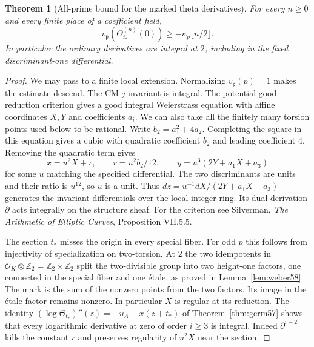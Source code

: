\documentclass[a4paper,11pt]{article}
\newtheorem{theorem}[proposition]{Theorem}
\theoremstyle{definition}
\theoremstyle{remark}
\newcommand{\ZZ}{\mathbb Z}\newcommand{\ord}{\operatorname{ord}}
\numberwithin{equation}{section}
\newcommand{\OO}{\mathcal O}
\begin{document}
\begin{theorem}[All-prime bound for the marked theta derivatives]\leavevmode
\label{thm:elliptic312}
For every \(n\ge0\) and every finite place of a coefficient field,
\[
 v_{\mathfrak p}\!\left(\Theta_{t_*}^{(n)}(0)\right)
                 \ge -\kappa_p\lfloor n/2\rfloor .
\]
In particular the ordinary derivatives are integral at \(2\),
including in the fixed discriminant-one differential.
\end{theorem}
\begin{proof}
We may pass to a finite local extension. Normalizing \(v_{\mathfrak p}(p)=1\)
makes the estimate descend. The CM \(j\)-invariant is integral.
The potential good reduction criterion gives a good integral
Weierstrass equation with affine coordinates \(X,Y\) and coefficients
\(a_i\). We can also take all the finitely many torsion points used
below to be rational. Write \(b_2=a_1^2+4a_2\). Completing the square
in this equation gives a cubic with quadratic coefficient \(b_2\)
and leading coefficient \(4\). Removing the quadratic term gives
\[
 x=u^2X+r,\qquad r=u^2 b_2/12,\qquad
 y=u^3(2Y+a_1X+a_3)
\]
for some \(u\) matching the specified differential. The two
discriminants are units and their ratio is \(u^{12}\), so \(u\)
is a unit. Thus \(dz=u^{-1}dX/(2Y+a_1X+a_3)\) generates the
invariant differentials over the local integer ring. Its dual
derivation \(\partial\) acts integrally on the structure sheaf.
For the criterion see Silverman, \emph{The Arithmetic of Elliptic
Curves}, Proposition VII.5.5.

The section \(t_*\) misses the origin in every special fiber.
For odd \(p\) this follows from injectivity of specialization
on two-torsion. At \(2\) the two idempotents in
\(\OO_K\otimes\ZZ_2=\ZZ_2\times\ZZ_2\) split the
two-divisible group into two height-one factors, one connected
in the special fiber and one \'{e}tale, as proved in
Lemma~\ref{lem:weber58}. The mark is the sum of the nonzero
points from the two factors. Its image in the \'{e}tale factor
remains nonzero. In particular \(X\) is regular at its reduction.
The identity
\((\log\Theta_{t_*})''(z)=-u_\Lambda-x(z+t_*)\) of
Theorem~\ref{thm:germ57} shows that every logarithmic derivative
at zero of order \(i\ge3\) is integral. Indeed \(\partial^{i-2}\)
kills the constant \(r\) and preserves regularity of \(u^2X\)
near the section.


\end{proof}
\end{document}
